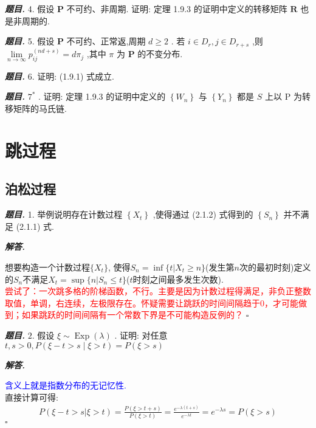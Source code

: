 \documentclass[10pt, a4paper, oneside]{ctexart}
\newenvironment{problem}{\begin{framed}\par\noindent\textbf{\textit{题目. }}}{\end{framed}\par}
\newenvironment{solution}{%
  \par\noindent\textbf{\textit{解答. }}\ignorespaces
}{%
  \hfill\ensuremath{\square}\par %
}
\begin{document}
\begin{problem}
    4. 假设 \( \mathbf{P} \) 不可约、非周期. 证明: 定理 1.9.3 的证明中定义的转移矩阵 \( \mathbf{R} \) 也是非周期的.
\end{problem}

\begin{problem}
    5. 假设  \( \mathbf{P} \)  不可约、正常返,周期  \( d \geq  2 \) . 若  \( i \in  {D}_{r},j \in  {D}_{r + s} \) ,则 \( \mathop{\lim }\limits_{{n \rightarrow  \infty }}{p}_{ij}^{\left( nd + s\right) } = d{\pi }_{j} \) ,其中 \( \pi  \) 为 \( \mathbf{P} \) 的不变分布.
\end{problem}

\begin{problem}
    6. 证明: (1.9.1) 式成立.
\end{problem}

\begin{problem}
    \( {7}^{ * } \) . 证明: 定理 1.9.3 的证明中定义的 \( \left\{  {W}_{n}\right\}   \) 与 \( \left\{  {Y}_{n}\right\}   \) 都是 \( S \) 上以 \( \mathrm{P} \) 为转移矩阵的马氏链.
\end{problem}

\section{跳过程}
\subsection{泊松过程}

\begin{problem}
    1. 举例说明存在计数过程 \( \left\{  {X}_{t}\right\}   \) ,使得通过 (2.1.2) 式得到的 \( \left\{  {S}_{n}\right\}   \)
并不满足 (2.1.1) 式.
\end{problem}
\begin{solution}
    想要构造一个计数过程$\{X_t\}$, 使得$S_n=\inf\{t|X_t\geq n\}$(发生第$n$次的最初时刻)定义的$S_n$不满足$X_t=\sup\{n|S_n\leq t\}$($t$时刻之间最多发生次数).\\
    \textcolor{red}{尝试了：一次跳多格的阶梯函数，不行。主要是因为计数过程得满足，非负正整数取值，单调，右连续，左极限存在。怀疑需要让跳跃的时间间隔趋于$0$，才可能做到；如果跳跃的时间间隔有一个常数下界是不可能构造反例的？}
\end{solution}

\begin{problem}
    \( 2. \) 假设 \( \xi  \sim  \operatorname{Exp}\left( \lambda \right)  \) . 证明: 对任意 \( t,s > 0,P\left( {\xi  - t > s \mid  \xi  > t}\right)  =  P(\xi>s)\) 
\end{problem}
\begin{solution}
    \textcolor{blue}{含义上就是指数分布的无记忆性.}\\ 直接计算可得:
    \begin{align*}
        P(\xi-t>s|\xi>t)=\frac{P(\xi>t+s)}{P(\xi>t)}=\frac{e^{-\lambda(t+s)}}{e^{-\lambda t}}=e^{-\lambda s}=P(\xi>s)
    \end{align*}
\end{solution}
\end{document}
